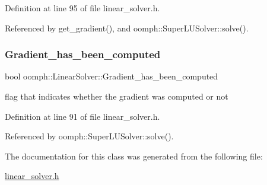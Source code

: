 Definition at line 95 of file linear\+\_\+solver.\+h.



Referenced by get\+\_\+gradient(), and oomph\+::\+Super\+L\+U\+Solver\+::solve().

\mbox{\label{classoomph_1_1LinearSolver_a9fd3bf9a5a94dcc23b7d903f99535e72}} 
\subsubsection{\texorpdfstring{Gradient\+\_\+has\+\_\+been\+\_\+computed}{Gradient\_has\_been\_computed}}
{\footnotesize\ttfamily bool oomph\+::\+Linear\+Solver\+::\+Gradient\+\_\+has\+\_\+been\+\_\+computed\hspace{0.3cm}{\ttfamily [protected]}}



flag that indicates whether the gradient was computed or not 



Definition at line 91 of file linear\+\_\+solver.\+h.



Referenced by oomph\+::\+Super\+L\+U\+Solver\+::solve().



The documentation for this class was generated from the following file\+:\begin{DoxyCompactItemize}
\item 
\hyperlink{linear__solver_8h}{linear\+\_\+solver.\+h}\end{DoxyCompactItemize}
